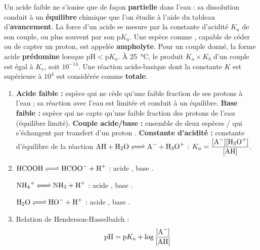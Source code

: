 \documentclass[11pt]{article}
\begin{document}
\begin{corrige}
Un acide faible ne s'ionise que de façon \textbf{partielle} dans l'eau : sa dissolution conduit à un \textbf{équilibre} chimique que l'on étudie à l'aide du tableau d'\textbf{avancement}. La force d'un acide se mesure par la constante d'acidité $K_a$ de son couple, ou plus souvent par son \textbf{$\mathrm{p}K_a$}. Une espèce comme , capable de céder ou de capter un proton, est appelée \textbf{ampholyte}. Pour un couple donné, la forme acide \textbf{prédomine} lorsque $\mathrm{pH} < \mathrm{p}K_a$. À \SI{25}{\celsius}, le produit $K_a \times K_b$ d'un couple est égal à \textbf{$K_e$}, soit $10^{-14}$. Une réaction acido-basique dont la constante $K$ est supérieure à $10^{4}$ est considérée comme \textbf{totale}.
\end{corrige}

\begin{corrige}
\begin{enumerate}
\item \textbf{Acide faible :} espèce qui ne cède qu'une faible fraction de ses protons à l'eau ; sa réaction avec l'eau est limitée et conduit à un équilibre. \textbf{Base faible :} espèce qui ne capte qu'une faible fraction des protons de l'eau (équilibre limité). \textbf{Couple acide/base :} ensemble de deux espèces / qui s'échangent par transfert d'un proton . \textbf{Constante d'acidité :} constante d'équilibre de la réaction $\ce{AH + H2O <=> A- + H3O+}$ : $K_a = \dfrac{[\ce{A-}][\ce{H3O+}]}{[\ce{AH}]}$.
\item $\ce{HCOOH <=> HCOO- + H+}$ : acide , base .\par
$\ce{NH4+ <=> NH3 + H+}$ : acide , base .\par
$\ce{H2O <=> HO- + H+}$ : acide , base .
\item Relation de Henderson-Hasselbalch :
\[ \mathrm{pH} = \mathrm{p}K_a + \log\frac{[\ce{A-}]}{[\ce{AH}]} \]
\end{enumerate}
\end{corrige}
\end{document}
